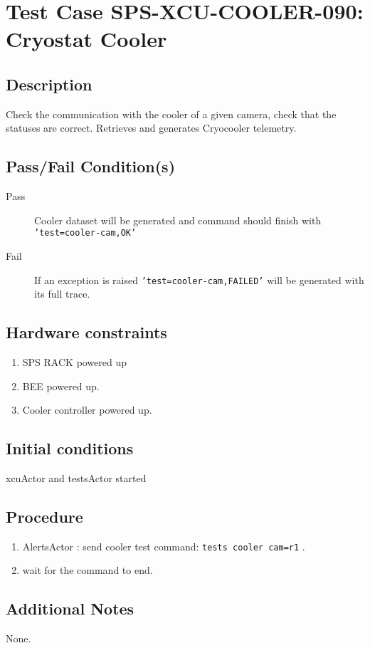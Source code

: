 \section{Test Case SPS-XCU-COOLER-090: Cryostat Cooler}

\subsection{Description}

Check the communication with the cooler of a given camera, check that the statuses are correct.
Retrieves and generates Cryocooler telemetry.

\subsection{Pass/Fail Condition(s)}

\begin{description}
\item [Pass] Cooler dataset will be generated and command should finish with \texttt{'test=cooler-cam,OK'}
\item [Fail] If an exception is raised \texttt{'test=cooler-cam,FAILED'} will be generated with its full trace.

\end{description}

\subsection{Hardware constraints}

\begin{enumerate}
    \item SPS RACK powered up
    \item BEE powered up.
    \item Cooler controller powered up.
\end{enumerate}

\subsection{Initial conditions}

xcuActor and testsActor started

\subsection{Procedure}

\begin{enumerate}
    \item AlertsActor : send cooler test command: \texttt{tests cooler cam=r1} .
    \item wait for the command to end.
\end{enumerate}

\subsection{Additional Notes}
None.
